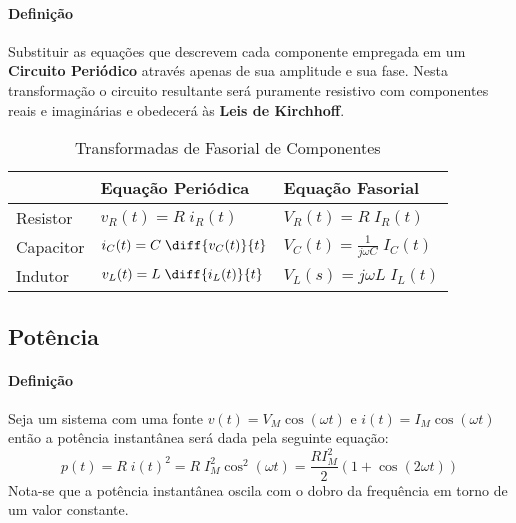 \documentclass{article}
\begin{document}
            \paragraph{Definição}Substituir as equações que descrevem cada componente empregada em um \textbf{Circuito Periódico} através apenas de sua amplitude e sua fase. Nesta transformação o circuito resultante será puramente resistivo com componentes reais e imaginárias e obedecerá às \textbf{Leis de Kirchhoff}.
                \begin{table}[H]
                    \centering
                    \begingroup
                    \renewcommand{\arraystretch}{1.25}
                    \begin{tabular}[]{lll}
                                  & Equação Periódica                  & Equação Fasorial\\\hline
                        Resistor  & $v_{R}(t) = R\;i_{R}(t)$           & $V_{R}(t) = R\;I_{R}(t)$\\[2.5mm]
                        Capacitor & $i_{C}(t) = C\;\diff{v_{C}(t)}{t}$ & $V_{C}(t) = \frac{1}{j\omega C}\;I_{C}(t)$\\[2.5mm]
                        Indutor   & $v_{L}(t) = L\;\diff{i_{L}(t)}{t}$ & $V_{L}(s) = j\omega L\;I_{L}(t)$\\[2.5mm]\hline
                    \end{tabular}
                    \endgroup
                    \caption{Transformadas de Fasorial de Componentes}\label{table:FasorialComponents}
                \end{table} \noindent

        \subsection{Potência}
            \paragraph{Definição}Seja um sistema com uma fonte $v(t) = V_{M}\cos(\omega t)$ e $i(t) = I_{M}\cos(\omega t)$ então a potência instantânea será dada pela seguinte equação:
                \begin{equation}
                    p(t) = 
                    R\;i(t)^{2} = 
                    R\;I_{M}^{2}\cos^{2}(\omega t) = 
                    \boxed{
                        \frac{R I_{M}^{2}}{2}(1 + \cos(2\omega t))
                    }
                \end{equation}
            Nota-se que a potência instantânea oscila com o dobro da frequência em torno de um valor constante.
\end{document}
